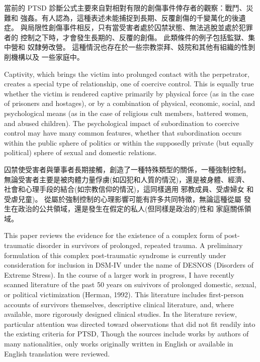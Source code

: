 \documentclass[12pt]{article}
\begin{document}
    當前的 PTSD 診斷公式主要來自對相對有限的創傷事件倖存者的觀察：戰鬥、災難和
    強姦。有人認為，這種表述未能捕捉到長期、反覆創傷的千變萬化的後遺症。
    與局限性創傷事件相反，只有當受害者處於囚禁狀態、無法逃脫並處於犯罪者的
    控制之下時，才會發生長期的、反覆的創傷。 此類條件的例子包括監獄、集中營和
    奴隸勞改營。 這種情況也存在於一些宗教崇拜、妓院和其他有組織的性剝削機構以及
    一些家庭中。

    Captivity, which brings the victim into prolunged contact with the
    perpetrator, creates a special type of relationship, one of coercive
    control. This is equally true whether the victim is rendered captive
    primarily by physical force (as in the case of prisoners and hostages), or
    by a combination of physical, economic, social, and psychological means (as
    in the case of religious cult members, battered women, and abused
    children). The psychological impact of subordination to coercive control
    may have many common features, whether that subordination occurs within the
    public sphere of politics or within the supposedly private (but equally
    political) sphere of sexual and domestic relations.

    囚禁使受害者與肇事者長期接觸，創造了一種特殊類型的關係，一種強制控制。
    無論受害者主要是被肉體力量俘虜(如囚犯和人質的情況)，還是被身體、經濟、
    社會和心理手段的結合(如宗教信仰的情況)，這同樣適用 邪教成員、受虐婦女
    和受虐兒童)。 從屬於強制控制的心理影響可能有許多共同特徵，無論這種從屬
    發生在政治的公共領域，還是發生在假定的私人(但同樣是政治的)性和
    家庭關係領域。

    This paper reviews the evidence for the existence of a complex form of
    post-traumatic disorder in survivors of prolonged, repeated trauma. A
    preliminary formulation of this complex post-traumatic syndrome is
    currently under consideration for inclusion in DSM-IV under the name of
    DESNOS (Disorders of Extreme Stress). In the course of a larger work in
    progress, I have recently scanned literature of the past 50 years on
    suivivors of prolonged domestic, sexual, or political victimization
    (Herman, 1992). This literature includes first-person accounts of survivors
    themselves, descriptive clinical literature, and, where available, more
    rigorously designed clinical studies. In the literature review, particular
    attention was directed toward observations that did not fit readily into
    the existing criteria for PTSD, Though the sources include works by authors
    of many nationalities, only works originally written in English or
    available in English translation were reviewed.
\end{document}
